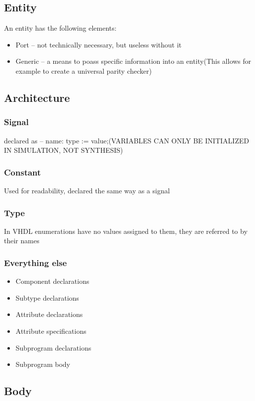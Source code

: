 \subsection{Entity}
An entity has the following elements:
\begin{itemize}
    \item Port -- not technically necessary, but useless without it
    \item Generic -- a means to poass specific information into an entity(This allows for example to create a universal parity checker)
\end{itemize}


\subsection{Architecture}
\subsubsection{Signal}
        declared as -- name: type := value;(VARIABLES CAN ONLY BE INITIALIZED IN SIMULATION, NOT SYNTHESIS)
\subsubsection{Constant}
        Used for readability, declared the same way as a signal
\subsubsection{Type}
    \nt
    {
        In VHDL enumerations have no values assigned to them, they are referred to by their names
    }
    \subsubsection{Everything else}
    \begin{itemize}
            \item Component declarations
            \item Subtype declarations
            \item Attribute declarations
            \item Attribute specifications
            \item Subprogram declarations
            \item Subprogram body
            
    \end{itemize}
\subsection{Body}
